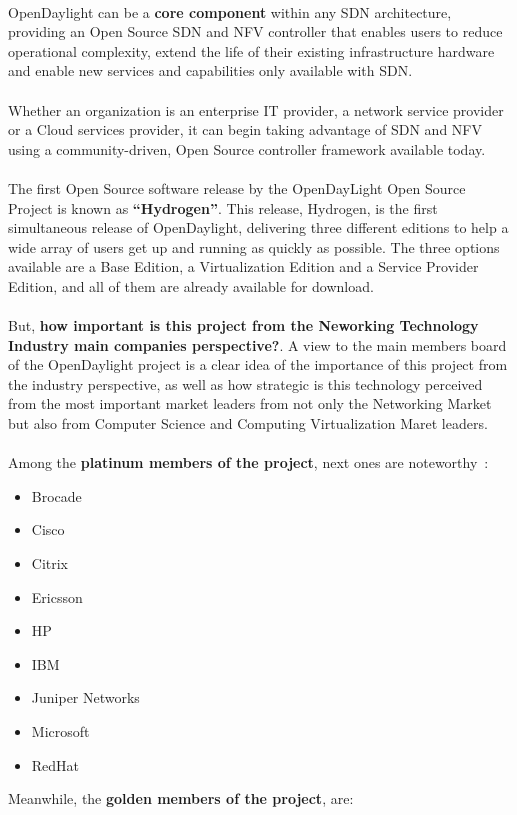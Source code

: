 \documentclass[a4paper, 12pt]{book}
\begin{document}
\\
OpenDaylight can be a \textbf{core component} within any SDN architecture, providing an Open Source SDN and NFV controller that enables users to reduce operational complexity, extend the life of their existing infrastructure hardware and enable new services and capabilities only available with SDN.\\
\\
Whether an organization is an enterprise IT provider, a network service provider or a Cloud services provider, it can begin taking advantage of SDN and NFV using a community-driven, Open Source controller framework available today.\\
\\
The first Open Source software release by the OpenDayLight Open Source Project is known as \textbf{``Hydrogen''}. This release, Hydrogen, is the first simultaneous release of OpenDaylight, delivering three different editions to help a wide array of users get up and running as quickly as possible. The three options available are a Base Edition, a Virtualization Edition and a Service Provider Edition, and all of them are already available for download.\\
\\
But, \textbf{how important is this project from the Neworking Technology Industry main companies perspective?}. A view to the main members board of the OpenDaylight project is a clear idea of the importance of this project from the industry perspective, as well as how strategic is this technology perceived from the most important market leaders from not only the Networking Market but also from Computer Science and Computing Virtualization Maret leaders.\\
\\
Among the \textbf{platinum members of the project}, next ones are noteworthy~\cite{OpenDaylightMembers}:
 \begin{itemize}\itemsep0pt
  \item Brocade
  \item Cisco
  \item Citrix
  \item Ericsson
  \item HP
  \item IBM
  \item Juniper Networks
  \item Microsoft
  \item RedHat
 \end{itemize}
Meanwhile, the \textbf{golden members of the project}, are:
\end{document}
